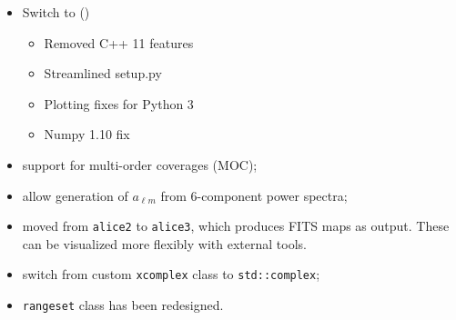 \documentclass[12pt,twoside]{article}
\begin{document}
{{\begin{itemize}
	\item Switch to 
	()
	\begin{itemize}
	\item Removed C++ 11 features%
    	\item Streamlined setup.py%
    	\item Plotting fixes for Python 3%
    	\item Numpy 1.10 fix%
	\end{itemize}
	\end{itemize}




\begin{itemize}
\item support for multi-order coverages (MOC);
\item allow generation of $a_{\ell m}$ from 6-component power spectra;
\item moved from \texttt{alice2} to \texttt{alice3}, which produces FITS \healpix maps as output.
 These can be visualized more flexibly with external tools.
\item switch from custom \texttt{xcomplex} class to \texttt{std::complex};
\item \texttt{rangeset} class has been redesigned.
\end{itemize}


}}
\end{document}
